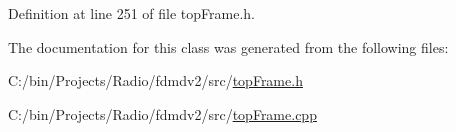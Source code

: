 Definition at line 251 of file top\-Frame.\-h.



The documentation for this class was generated from the following files\-:\begin{DoxyCompactItemize}
\item 
C\-:/bin/\-Projects/\-Radio/fdmdv2/src/\hyperlink{top_frame_8h}{top\-Frame.\-h}\item 
C\-:/bin/\-Projects/\-Radio/fdmdv2/src/\hyperlink{top_frame_8cpp}{top\-Frame.\-cpp}\end{DoxyCompactItemize}
